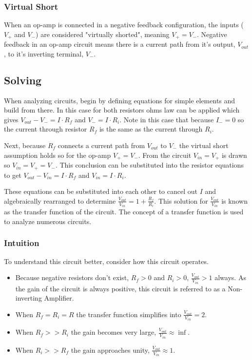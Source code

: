 \documentclass[main.tex]{subfiles}
\begin{document}
\subsubsection{Virtual Short}
\noindent When an op-amp is connected in a negative feedback configuration, the inputs ($V_{+}$ and $V_{-}$) are considered "virtually shorted", meaning $V_{+} = V_{-}$. Negative feedback in an op-amp circuit means there is a current path from it's output, $V_{out}$, to it's inverting terminal, $V_{-}$.

\subsection{Solving}
\noindent When analyzing circuits, begin by defining equations for simple elements and build from there. In this case for both resistors ohms law can be applied which gives $V_{out} - V_{-} = I \cdot R_f$ and $V_{-} = I \cdot R_i$. Note in this case that because $I_{-} = 0$ so the current through resistor $R_f$ is the same as the current through $R_i$. \newline

\newnoindentpara Next, because $R_f$ connects a current path from $V_{out}$ to $V_{-}$ the virtual short assumption holds so for the op-amp $V_{+} = V_{-}$. From the circuit $V_{in} = V_{+}$ is drawn so $V_{in} = V_{+} = V_{-}$. This conclusion can be substituted into the resistor equations to get $V_{out} - V_{in} = I \cdot R_f$ and $V_{in} = I \cdot R_i$. \newline

\newnoindentpara These equations can be substituted into each other to cancel out $I$ and algebraically rearranged to determine $\frac{V_{out}}{V_{in}} = 1 + \frac{R_f}{R_i}$. This solution for $\frac{V_{out}}{V_{in}}$ is known as the transfer function of the circuit. The concept of a transfer function is used to analyze numerous circuits. 

\subsubsection{Intuition}
To understand this circuit better, consider how this circuit operates.
\begin{itemize}
    \item Because negative resistors don't exist, $R_f > 0$ and $R_i > 0$, $\frac{V_{out}}{V_{in}} > 1$ always. As the gain of the circuit is always positive, this circuit is referred to as a Non-inverting Amplifier. 
    \item When $R_f = R_i = R$ the transfer function simplifies into $\frac{V_{out}}{V_{in}} = 2$.
    \item When $R_f >> R_i$ the gain becomes very large, $\frac{V_{out}}{V_{in}} \approx \inf$.
    \item When $R_i >> R_f$ the gain approaches unity, $\frac{V_{out}}{V_{in}} \approx 1$.
\end{itemize}
\end{document}
